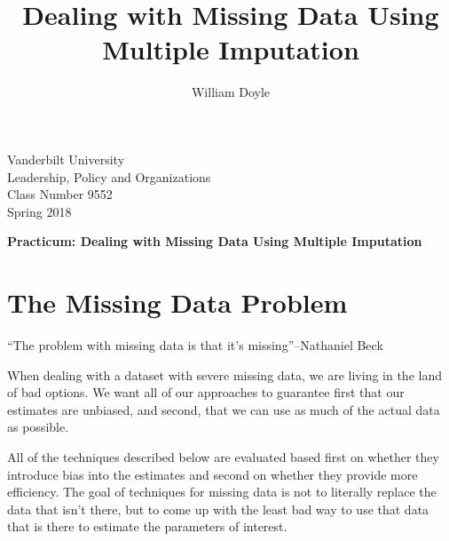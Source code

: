 \documentclass[12 pt]{article}
\title{Dealing with Missing Data Using Multiple Imputation}
\author{William Doyle}
\begin{document}
\thispagestyle{empty}%

\setlength{\parskip}{1ex plus 0.5ex minus 0.2ex}

\setcounter{secnumdepth}{-2}


\begin{flushleft}
  Vanderbilt University\\Leadership, Policy and Organizations\\Class Number 9552\\ Spring 2018\\
\end{flushleft}

\begin{center}
\textbf{Practicum: Dealing with Missing Data Using Multiple Imputation}
\end{center}

\section{The Missing Data Problem}
\label{sec:misss-data-probl}

``The problem with missing data is that it's missing''--Nathaniel Beck

When dealing with a dataset with severe missing data, we are living in
the land of bad options. We want all of our approaches to guarantee
first that our estimates are unbiased, and second, that we can use as
much of the actual data as possible. 

All of the techniques described below are evaluated based first on
whether they introduce bias into the estimates and second on whether
they provide more efficiency.  The goal of techniques for missing data
is not to literally replace the data that isn't there, but to come up
with the least bad way to use that data that is there to estimate the
parameters of interest.
\end{document}
